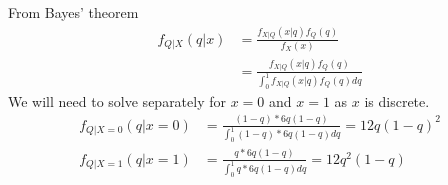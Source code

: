 \documentclass[../../probability-notes.tex]{subfiles}
\begin{document}
        From Bayes' theorem 
        \begin{align*}
            f_{Q|X}(q|x) &= \frac{f_{X|Q}(x|q) f_{Q}(q)}{f_{X}(x)}\\
                        &= \frac{f_{X|Q}(x|q) f_{Q}(q)}{\int_{0}^{1} f_{X|Q}(x|q) f_{Q}(q) dq}
        \end{align*}
        We will need to solve separately for $x = 0$ and $x = 1$ as $x$ is discrete.
        \begin{align*}
            f_{Q|X=0}(q|x=0) &= \frac{(1-q)* 6q(1-q)}{\int_{0}^{1} (1-q)*6q(1-q) dq} = 12q(1-q)^{2}\\
            f_{Q|X=1}(q|x=1) &= \frac{q* 6q(1-q)}{\int_{0}^{1} q*6q(1-q) dq} = 12q^{2}(1-q)
        \end{align*}
\end{document}
